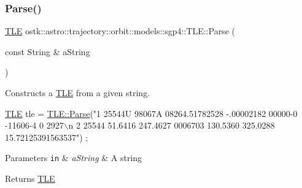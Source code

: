 \subsubsection{\texorpdfstring{Parse()}{Parse()}}
{\footnotesize\ttfamily \hyperlink{classostk_1_1astro_1_1trajectory_1_1orbit_1_1models_1_1sgp4_1_1_t_l_e}{T\+LE} ostk\+::astro\+::trajectory\+::orbit\+::models\+::sgp4\+::\+T\+L\+E\+::\+Parse (\begin{DoxyParamCaption}\item[{const String \&}]{a\+String }\end{DoxyParamCaption})\hspace{0.3cm}{\ttfamily [static]}}



Constructs a \hyperlink{classostk_1_1astro_1_1trajectory_1_1orbit_1_1models_1_1sgp4_1_1_t_l_e}{T\+LE} from a given string. 


\begin{DoxyCode}
\hyperlink{classostk_1_1astro_1_1trajectory_1_1orbit_1_1models_1_1sgp4_1_1_t_l_e_a57323db2c24577c2e8ddce79fa776d1e}{TLE} tle = \hyperlink{classostk_1_1astro_1_1trajectory_1_1orbit_1_1models_1_1sgp4_1_1_t_l_e_a7f97a74af47895aa315aebc52f410d26}{TLE::Parse}(\textcolor{stringliteral}{"1 25544U 98067A   08264.51782528 -.00002182  00000-0 -11606-4 0  2927\(\backslash\)n}
\textcolor{stringliteral}{                      2 25544  51.6416 247.4627 0006703 130.5360 325.0288 15.72125391563537"}) ;
\end{DoxyCode}



\begin{DoxyParams}[1]{Parameters}
\mbox{\tt in}  & {\em a\+String} & A string \\
\hline
\end{DoxyParams}
\begin{DoxyReturn}{Returns}
\hyperlink{classostk_1_1astro_1_1trajectory_1_1orbit_1_1models_1_1sgp4_1_1_t_l_e}{T\+LE} 
\end{DoxyReturn}
\mbox{\label{classostk_1_1astro_1_1trajectory_1_1orbit_1_1models_1_1sgp4_1_1_t_l_e_a871cdedd5bc51c9f3afa976e0597ea51}} 
